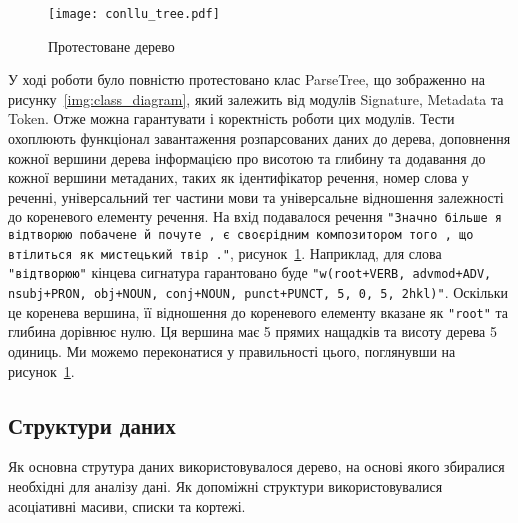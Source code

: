 \begin{figure}[ht]
  \begin{center}
    \texttt{[image: conllu\_tree.pdf]}
  \end{center}
  \caption{Протестоване дерево}
  \label{img:tested_conllu_tree}
\end{figure}

У ході роботи було повністю протестовано клас ParseTree, що зображенно на
рисунку~\ref{img:class_diagram}, який залежить від модулів Signature, Metadata
та Token. Отже можна гарантувати і коректність роботи цих
модулів. Тести охоплюють функціонал завантаження розпарсованих даних до дерева, доповнення
кожної вершини дерева інформацією про висотою та глибину та додавання до кожної
вершини метаданих, таких як ідентифікатор речення, номер слова у реченні, універсальний тег
частини мови та універсальне відношення залежності до кореневого елементу речення.
На вхід подавалося речення \texttt{"Значно більше я відтворюю побачене й почуте , є своєрідним
композитором того , що втілиться як мистецький твір ."}, рисунок~\ref{img:tested_conllu_tree}.
Наприклад, для слова \texttt{"відтворюю"} кінцева сигнатура гарантовано буде
\texttt{"w(root+VERB, advmod+ADV, nsubj+PRON, obj+NOUN, conj+NOUN, punct+PUNCT, 5, 0, 5, 2hkl)"}.
Оскільки це коренева вершина, її відношення до кореневого елементу вказане як \texttt{"root"}
та глибина дорівнює нулю. Ця вершина має 5 прямих нащадків та висоту дерева 5 одиниць. Ми можемо
переконатися у правильності цього, поглянувши на рисунок~\ref{img:tested_conllu_tree}.

\subsection{Структури даних}
Як основна струтура даних використовувалося дерево, на основі якого збиралися необхідні
для аналізу дані. Як допоміжні структури використовувалися асоціативні масиви, списки та
кортежі.

